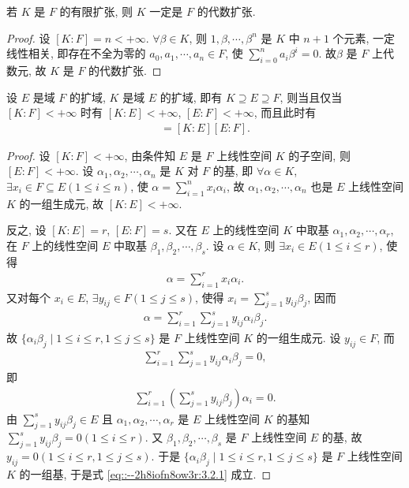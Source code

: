 \documentclass[../../main.tex]{subfiles}%
\begin{document}
\begin{corollary}
若 $K$ 是 $F$ 的有限扩张, 则 $K$ 一定是 $F$ 的代数扩张.
\end{corollary}
\begin{proof}

设 $[K:F]=n<+\infty$. $\forall \beta\in K$, 则 $1,\beta,\cdots,\beta^n$ 是 $K$ 中 $n+1$ 个元素, 一定线性相关, 即存在不全为零的 $a_0,a_1,\cdots,a_n\in F$, 使 $\sum\limits_{i=0}^{n}a_i\beta^i=0$. 故$\beta$ 是 $F$ 上代数元, 故 $K$ 是 $F$ 的代数扩张.


\end{proof}

\begin{theorem}\label{theorem:定理3.2.2--抽象代数}
设 $E$ 是域 $F$ 的扩域, $K$ 是域 $E$ 的扩域, 即有 $K\supseteq E\supseteq F$, 则当且仅当 $[K:F]<+\infty$ 时有 $[K:E]<+\infty$, $[E:F]<+\infty$, 而且此时有
\begin{align}
[K:F]=[K:E][E:F].\label{eq::--2h8iofn8ow3r:3.2.1}
\end{align}
\end{theorem}
\begin{proof}

设 $[K:F]<+\infty$, 由条件知 $E$ 是 $F$ 上线性空间 $K$ 的子空间, 则$[E:F]<+\infty$. 设 $\alpha_1,\alpha_2,\cdots,\alpha_n$ 是 $K$ 对 $F$ 的基, 即 $\forall \alpha\in K$, $\exists x_i\in F\subseteq E(1\leqslant i\leqslant n)$, 使 $\alpha=\sum\limits_{i=1}^{n}x_i\alpha_i$, 故 $\alpha_1,\alpha_2,\cdots,\alpha_n$ 也是 $E$ 上线性空间 $K$ 的一组生成元, 故 $[K:E]<+\infty$.

反之, 设 $[K:E]=r$, $[E:F]=s$. 又在 $E$ 上的线性空间 $K$ 中取基 $\alpha_1,\alpha_2,\cdots,\alpha_r$, 在 $F$ 上的线性空间 $E$ 中取基 $\beta_1,\beta_2,\cdots,\beta_s$. 设 $\alpha\in K$, 则 $\exists x_i\in E(1\leqslant i\leqslant r)$, 使得
\begin{align*}
\alpha=\sum\limits_{i=1}^{r}x_i\alpha_i.
\end{align*}
又对每个 $x_i\in E$, $\exists y_{ij}\in F(1\leqslant j\leqslant s)$, 使得 $x_i=\sum\limits_{j=1}^{s}y_{ij}\beta_j$, 因而
\begin{align*}
\alpha=\sum\limits_{i=1}^{r}\sum\limits_{j=1}^{s}y_{ij}\alpha_i\beta_j.
\end{align*}
故 $\{\alpha_i\beta_j\mid 1\leqslant i\leqslant r,1\leqslant j\leqslant s\}$ 是 $F$ 上线性空间 $K$ 的一组生成元. 设 $y_{ij}\in F$, 而
\begin{align*}
\sum\limits_{i=1}^{r}\sum\limits_{j=1}^{s}y_{ij}\alpha_i\beta_j=0,
\end{align*}
即
\begin{align*}
\sum\limits_{i=1}^{r}\left(\sum\limits_{j=1}^{s}y_{ij}\beta_j\right)\alpha_i=0.
\end{align*}
由 $\sum\limits_{j=1}^{s}y_{ij}\beta_j\in E$ 且 $\alpha_1,\alpha_2,\cdots,\alpha_r$ 是 $E$ 上线性空间 $K$ 的基知 $\sum\limits_{j=1}^{s}y_{ij}\beta_j=0(1\leqslant i\leqslant r)$. 又 $\beta_1,\beta_2,\cdots,\beta_s$ 是 $F$ 上线性空间 $E$ 的基, 故 $y_{ij}=0(1\leqslant i\leqslant r,1\leqslant j\leqslant s)$. 于是 $\{\alpha_i\beta_j\mid 1\leqslant i\leqslant r,1\leqslant j\leqslant s\}$ 是 $F$ 上线性空间 $K$ 的一组基, 于是式 \eqref{eq::--2h8iofn8ow3r:3.2.1} 成立.


\end{proof}
\end{document}
